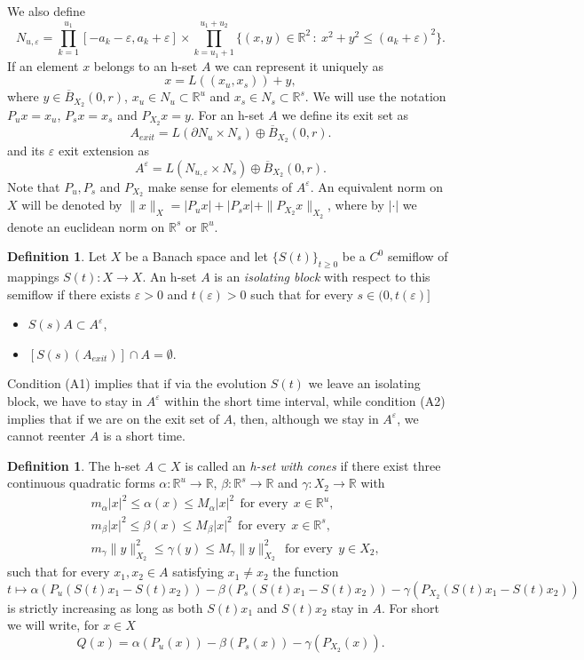 \documentclass[11pt, leqno]{amsart}
\theoremstyle{definition}
\newtheorem{df}[thm]{Definition}
\def\R{\mathbb{R}}
\begin{document}
We also define
$$
N_{u,\varepsilon} = \prod_{k=1}^{u_1}[-a_k-\varepsilon, a_k+\varepsilon] \times \prod_{k=u_1+1}^{u_1+u_2}\{(x,y)\in \mathbb{R}^2\, :\ x^2+y^2\leq (a_k+\varepsilon)^2\}.
$$
If an element $x$ belongs to an h-set $A$ we can represent it uniquely as
$$
x = L((x_u,x_s)) + y,
$$
where $y \in \overline B_{X_2}(0,r)$, $x_u \in N_u \subset \mathbb{R}^u$ and $x_s \in N_s \subset \mathbb{R}^s$. We will use the notation $P_u x = x_u$, $P_{s}x = x_s$ and $P_{X_2}x = y$.
For an h-set $A$ we define its exit set as $$
A_{exit} = L \left( \partial N_u \times N_s\right) \oplus \overline{B}_{X_2}(0,r).
$$
and its $\varepsilon$ exit extension as
$$
A^\varepsilon = L \left( N_{u,\varepsilon} \times N_s\right) \oplus \overline{B}_{X_2}(0,r).
$$
Note that $P_u, P_{s}$ and $P_{X_2}$ make sense for elements of $A^\varepsilon$. An equivalent norm on $X$ will be denoted by $\|x\|_X = |P_u x| + |P_{s}x|+\|P_{X_2}x\|_{X_2}$, where by $|\cdot |$ we denote an euclidean norm on $\R^s$ or $\R^u$.
\begin{df}\label{isolation}
	Let $X$ be a Banach space and let $\{ S(t) \}_{t\geq 0}$ be a $C^0$ semiflow of mappings $S(t):X\to X$. An h-set $A$ is an \textit{isolating block} with respect to this semiflow if there exists $\varepsilon > 0$ and  $t(\varepsilon)>0$ such that for every $s\in (0,t(\varepsilon)]$
	\begin{itemize}
		\item[(A1)] $S(s)A\subset A^\varepsilon$,
		\item[(A2)] $\left[S(s)\left(A_{exit}\right)\right] \cap A = \emptyset$.
	\end{itemize}
	
\end{df}
Condition (A1) implies that if via the evolution $S(t)$ we leave an isolating block, we have to stay in $A^\varepsilon$ within the short time interval, while condition (A2) implies that if we are on the exit set of $A$, then, although we stay in $A^\varepsilon$,  we cannot reenter $A$ is a short time.
\begin{df}\label{df:17}
	The h-set  $A \subset X$ is called an \textit{h-set with cones} if there exist three continuous quadratic  forms $\alpha:\mathbb{R}^u \to \R$, $\beta:\mathbb{R}^{s} \to \R$ and $\gamma: X_2\to \R$ with
	\begin{align*}
		& m_\alpha |x|^2 \leq \alpha(x) \leq M_{\alpha}|x|^2\ \ \textrm{for every}\ \ x\in \mathbb{R}^u,\\
		& m_\beta |x|^2 \leq \beta(x) \leq M_{\beta}|x|^2\ \ \textrm{for every}\ \ x\in \mathbb{R}^{s},\\
		& m_\gamma \|y\|_{X_2}^2 \leq \gamma(y) \leq M_{\gamma}\|y\|_{X_2}^2\ \ \textrm{for every}\ \ y\in X_2,
	\end{align*}
	such that for every $x_1, x_2\in A$ satisfying $x_1\neq x_2$ the function
	$$
	t\mapsto \alpha(P_u (S(t)x_1-S(t)x_2)) - \beta(P_{s} (S(t)x_1-S(t)x_2)) - \gamma(P_{X_2} (S(t)x_1-S(t)x_2))
	$$
	is strictly increasing as long as both $S(t)x_1$ and $S(t)x_2$ stay in $A$.
	For short we will write, for $x\in X$
	$$
	Q(x) = \alpha(P_u(x)) - \beta(P_{s}(x)) - \gamma(P_{X_2}(x)).
	$$
\end{df}
\end{document}
